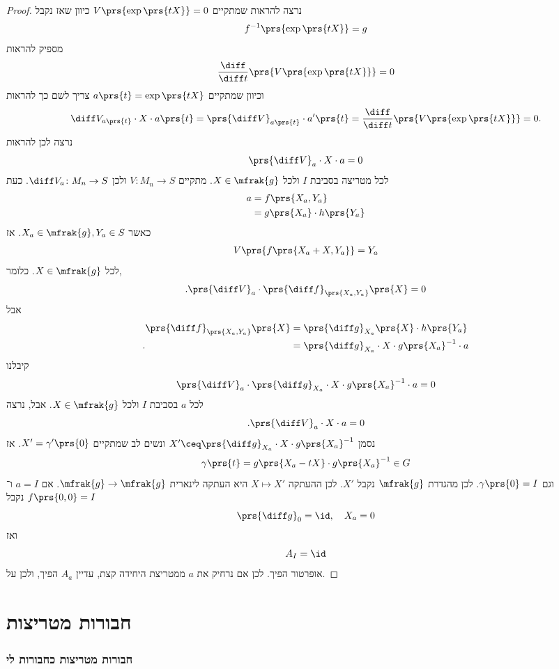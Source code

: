 \documentclass[10pt, twoside]{book}
\begin{document}
\begin{proof}
נרצה להראות שמתקיים
$V\prs{\exp\prs{tX}} = 0$
כיוון שאז נקבל
\[f^{-1}\prs{\exp\prs{tX}} = g\]
מספיק להראות
\[\frac{\diff}{\diff t} \prs{V \prs{\exp\prs{tX}}} = 0\]
וכיוון שמתקיים
$a\prs{t} = \exp\prs{tX}$
צריך לשם כך להראות
\[\diff V_{a\prs{t}} \cdot X \cdot a\prs{t} = \prs{\diff V}_{a\prs{t}} \cdot a'\prs{t} = \frac{\diff}{\diff t} \prs{V \prs{\exp \prs{tX}}} = 0 \text{.}\]
נרצה לכן להראות
\[\prs{\diff V}_a \cdot X \cdot a = 0\]
לכל מטריצה בסביבת
$I$
ולכל
$X \in \mfrak{g}$.
מתקיים
$V \colon M_n \to S$
ולכן
$\diff V_a \colon M_n \to S$.
כעת
\begin{align*}
a &= f\prs{X_a, Y_a}
\\&=
g\prs{X_a} \cdot h\prs{Y_a}
\end{align*}
כאשר
$X_a \in \mfrak{g}, Y_a \in S$.
אז
\begin{align*}
V\prs{f\prs{X_a + X, Y_a}} = Y_a
\end{align*}
לכל
$X \in \mfrak{g}$.
כלומר,
\[\text{.} \prs{\diff V}_a \cdot \prs{\diff f}_{\prs{X_a, Y_a}} \prs{X} = 0\]
אבל
\begin{align*}
\prs{\diff f}_{\prs{X_a, Y_a}}\prs{X} &= \prs{\diff g}_{X_a} \prs{X} \cdot h\prs{Y_a}
\\\text{.} \hphantom{\prs{\diff f}_{\prs{X_a, Y_a}}\prs{X}}&=
\prs{\diff g}_{X_a} \cdot X \cdot g\prs{X_a}^{-1} \cdot a  
\end{align*}
קיבלנו
\[\prs{\diff V}_a \cdot \prs{\diff g}_{X_a} \cdot X \cdot g\prs{X_a}^{-1} \cdot a = 0\]
לכל
$a$
בסביבת
$I$
ולכל
$X \in \mfrak{g}$.
אבל, נרצה
\[\text{.}\prs{\diff V}_a \cdot X \cdot a = 0\]
נסמן
$X' \ceq \prs{\diff g}_{X_a} \cdot X \cdot g\prs{X_a}^{-1}$
ונשים לב שמתקיים
$X' = \gamma'\prs{0}$.
אז
\[\gamma\prs{t} = g\prs{X_a - tX} \cdot g\prs{X_a}^{-1} \in G\]
וגם
$\gamma\prs{0} = I$.
לכן מהגדרת
$\mfrak{g}$
נקבל
$X'$.
לכן ההעתקה
$X \mapsto X'$
היא העתקה לינארית
$\mfrak{g} \to \mfrak{g}$.
אם
$a = I$
ו־%
$f\prs{0,0} = I$
נקבל
\[\prs{\diff g}_0 = \id, \quad X_a = 0\]
ואז
\[A_I = \id\]
אופרטור הפיך.
לכן אם נרחיק את
$a$
ממטריצת היחידה קצת, עדיין
$A_a$
הפיך, ולכן על.
\end{proof}


\chapter{חבורות מטריצות}

\subsection{חבורות מטריצות כחבורות לי}
\end{document}
